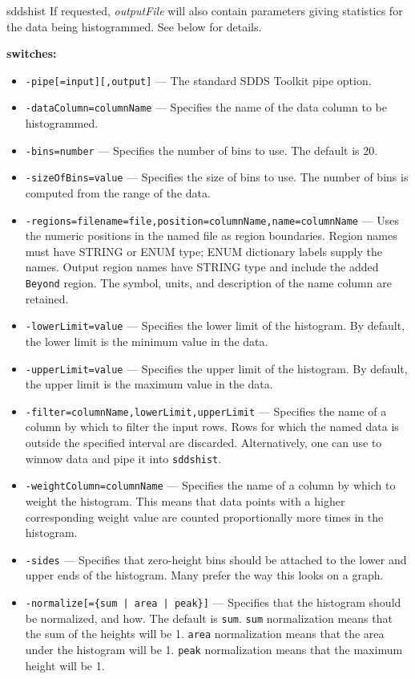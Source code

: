 \begin{sddsprog}{sddshist}
    If requested, \emph{outputFile} will also contain parameters giving statistics for the data being histogrammed. See below for details.
  \item \textbf{switches:}
    \begin{itemize}
      \item \verb|-pipe[=input][,output]| --- The standard SDDS Toolkit pipe option.
      \item \verb|-dataColumn=columnName| --- Specifies the name of the data column to be histogrammed.
      \item \verb|-bins=number| --- Specifies the number of bins to use. The default is 20.
      \item \verb|-sizeOfBins=value| --- Specifies the size of bins to use. The number of bins is computed from the range of the data.
      \item \verb|-regions=filename=file,position=columnName,name=columnName| --- Uses the numeric positions in the named file as region boundaries. Region names must have STRING or ENUM type; ENUM dictionary labels supply the names. Output region names have STRING type and include the added \verb|Beyond| region. The symbol, units, and description of the name column are retained.
      \item \verb|-lowerLimit=value| --- Specifies the lower limit of the histogram. By default, the lower limit is the minimum value in the data.
      \item \verb|-upperLimit=value| --- Specifies the upper limit of the histogram. By default, the upper limit is the maximum value in the data.
      \item \verb|-filter=columnName,lowerLimit,upperLimit| --- Specifies the name of a column by which to filter the input rows. Rows for which the named data is outside the specified interval are discarded. Alternatively, one can use  to winnow data and pipe it into \verb|sddshist|.
      \item \verb|-weightColumn=columnName| --- Specifies the name of a column by which to weight the histogram. This means that data points with a higher corresponding weight value are counted proportionally more times in the histogram.
      \item \verb|-sides| --- Specifies that zero-height bins should be attached to the lower and upper ends of the histogram. Many prefer the way this looks on a graph.
      \item \verb!-normalize[={sum | area | peak}]! --- Specifies that the histogram should be normalized, and how. The default is \verb|sum|. \verb|sum| normalization means that the sum of the heights will be 1. \verb|area| normalization means that the area under the histogram will be 1. \verb|peak| normalization means that the maximum height will be 1.

\end{itemize}
\end{sddsprog}

